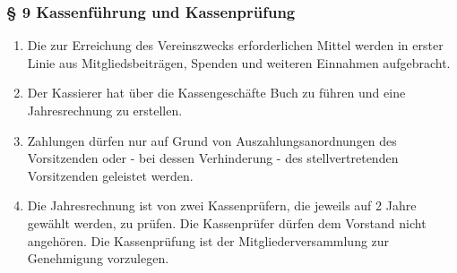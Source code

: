 \documentclass[a4paper,10pt]{article}
\begin{document}
\subsubsection*{§ 9 Kassenführung und Kassenprüfung}
\begin{enumerate}
  \item Die zur Erreichung des Vereinszwecks erforderlichen Mittel werden in erster
Linie aus Mitgliedsbeiträgen, Spenden und weiteren Einnahmen aufgebracht.
\item Der Kassierer hat über die Kassengeschäfte Buch zu führen und eine
Jahresrechnung zu erstellen.
\item Zahlungen dürfen nur auf Grund von Auszahlungsanordnungen des Vorsitzenden oder
- bei dessen Verhinderung - des stellvertretenden Vorsitzenden geleistet werden.
\item Die Jahresrechnung ist von zwei Kassenprüfern, die jeweils auf 2 Jahre
  gewählt werden, zu prüfen. Die Kassenprüfer dürfen dem Vorstand nicht
  angehören. Die Kassenprüfung ist der Mitgliederversammlung zur Genehmigung
  vorzulegen.
\end{enumerate}
\end{document}
